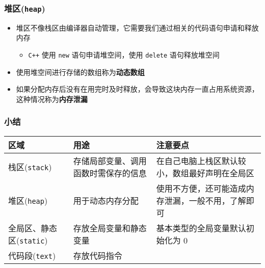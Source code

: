 \begin{frame}[fragile]
    \frametitle{堆区(\lstinline|heap|)}

    \begin{itemize}
        \item<1-> 堆区不像栈区由编译器自动管理，它需要我们通过相关的代码语句申请和释放内存
            \begin{itemize}
                \item \lstinline|C++| 使用 \lstinline|new| 语句申请堆空间，使用 \lstinline|delete| 语句释放堆空间
            \end{itemize}
       \item<2-> 使用堆空间进行存储的数组称为\textbf{动态数组}
       \item<2-> 如果分配内存后没有在用完时及时释放，会导致这块内存一直占用系统资源，这种情况称为\textbf{内存泄漏}
    \end{itemize}
\end{frame}

\begin{frame}[fragile]
    \frametitle{小结}

    \begin{table}[!ht]
        \centering
        \renewcommand{\arraystretch}{1.5} %
        \begin{tabular}{p{2.2cm}p{3.5cm}p{4cm}}
            \hline
            \textbf{区域}             & \textbf{用途}                     & \textbf{注意要点} \\ \hline
            栈区(\lstinline|stack|)   & 存储局部变量、调用函数时需保存的信息 & 在自己电脑上栈区默认较小，数组最好声明在全局区 \\ \hline
            堆区(\lstinline|heap|)    & 用于动态内存分配                   & 使用不方便，还可能造成内存泄漏，一般不用，了解即可 \\ \hline
            全局区、静态区(\lstinline|static|) & 存放全局变量和静态变量     & 基本类型的全局变量默认初始化为 $0$ \\ \hline
            代码段(\lstinline|text|)   & 存放代码指令                     & \lstinline| |  \\ \hline
        \end{tabular} 
    \end{table}

\end{frame}

